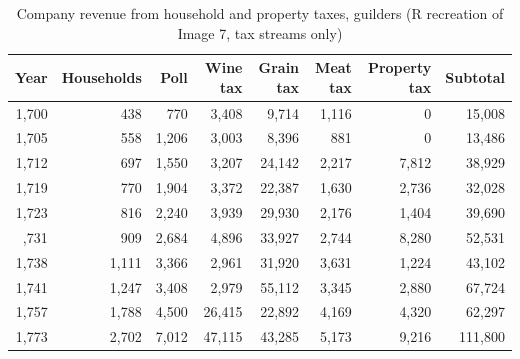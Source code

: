 \begin{table}

\caption{Company revenue from household and property taxes, guilders (R recreation of Image 7, tax streams only)}
\centering
\begin{tabular}[t]{rrrrrrrr}
\toprule
Year & Households & Poll & Wine tax & Grain tax & Meat tax & Property tax & Subtotal\\
\midrule
1,700 & 438 & 770 & 3,408 & 9,714 & 1,116 & 0 & 15,008\\
1,705 & 558 & 1,206 & 3,003 & 8,396 & 881 & 0 & 13,486\\
1,712 & 697 & 1,550 & 3,207 & 24,142 & 2,217 & 7,812 & 38,929\\
1,719 & 770 & 1,904 & 3,372 & 22,387 & 1,630 & 2,736 & 32,028\\
1,723 & 816 & 2,240 & 3,939 & 29,930 & 2,176 & 1,404 & 39,690\\
\addlinespace
1,731 & 909 & 2,684 & 4,896 & 33,927 & 2,744 & 8,280 & 52,531\\
1,738 & 1,111 & 3,366 & 2,961 & 31,920 & 3,631 & 1,224 & 43,102\\
1,741 & 1,247 & 3,408 & 2,979 & 55,112 & 3,345 & 2,880 & 67,724\\
1,757 & 1,788 & 4,500 & 26,415 & 22,892 & 4,169 & 4,320 & 62,297\\
1,773 & 2,702 & 7,012 & 47,115 & 43,285 & 5,173 & 9,216 & 111,800\\
\bottomrule
\end{tabular}
\end{table}
